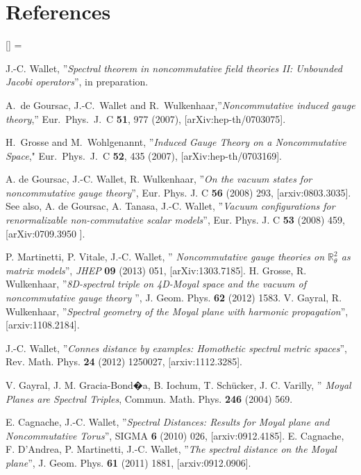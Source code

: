 \documentclass[a4paper]{jpconf}
\numberwithin{equation}{section}
\theoremstyle{nonumberplain}
\renewenvironment{thebibliography}[1]{%
\section*{References}%
\frenchspacing\small%
\begin{list}{[\arabic{enumi}]}%
{%
\usecounter{enumi}\parsep=2pt\topsep 0pt%
\settowidth{\labelwidth}{[#1]}%
\leftmargin=\labelwidth\advance\leftmargin\labelsep%
\rightmargin=0pt\itemsep=1pt\sloppy%
}%
}{\end{list}}
\begin{document}
\begin{thebibliography}{50}
 J.-C. Wallet, ''{\it{Spectral theorem in noncommutative field theories II: Unbounded Jacobi operators}}'', in preparation.

 A.~de Goursac, J.-C.~Wallet and R.~Wulkenhaar,''{\it{Noncommutative induced gauge theory}},''
Eur.\ Phys.\ J.\  C {\bf 51}, 977 (2007), [arXiv:hep-th/0703075].

H.~Grosse and M.~Wohlgenannt, ''{\it{Induced Gauge Theory on a Noncommutative Space}}," Eur.\ Phys.\ J.\  C {\bf 52}, 435 (2007), [arXiv:hep-th/0703169]. 

 A. de Goursac, J.-C. Wallet, R. Wulkenhaar, ''{\it{On the vacuum states for noncommutative gauge theory}}'', Eur. Phys. J. C {\bf{56}} (2008) 293, [arxiv:0803.3035]. 
See also, A. de Goursac, A. Tanasa, J.-C. Wallet, ''{\it{Vacuum configurations for renormalizable non-commutative scalar models}}'', Eur. Phys. J. C {\bf{53}} (2008) 459, [arXiv:0709.3950 ].

 P. Martinetti, P. Vitale, J.-C. Wallet, ''{\it{ Noncommutative gauge theories on $\mathbb{R}^2_\theta$ as matrix models}}'', \textit{JHEP} \textbf{09} (2013) 051, [arXiv:1303.7185].
 H. Grosse, R. Wulkenhaar, ''{\it{8D-spectral triple on 4D-Moyal space and the vacuum of noncommutative gauge theory }}'', J. Geom. Phys. {\bf{62}} (2012) 1583. V. Gayral, R. Wulkenhaar, ''{\it{Spectral geometry of the Moyal plane with harmonic propagation}}'', [arxiv:1108.2184].

 J.-C. Wallet, ''{\it{Connes distance by examples: Homothetic spectral metric spaces}}'', Rev. Math. Phys. {\bf{24}} (2012) 1250027, [arxiv:1112.3285]. 

 V. Gayral, J. M. Gracia-Bond�a, B. Iochum, T. Sch\"ucker, J. C. Varilly, ''{\it{ Moyal Planes are Spectral Triples}}, Commun. Math. Phys. {\bf{246}} (2004) 569.

 E. Cagnache, J.-C. Wallet, ''{\it{Spectral Distances: Results for Moyal plane and Noncommutative Torus}}'', SIGMA {\bf{6}} (2010) 026, [arxiv:0912.4185]. 
E. Cagnache, F. D'Andrea, P. Martinetti, J.-C. Wallet, ''{\it{The spectral distance on the Moyal plane}}'', J. Geom. Phys. {\bf{61}} (2011) 1881, [arxiv:0912.0906].


\end{thebibliography}
\end{document}
